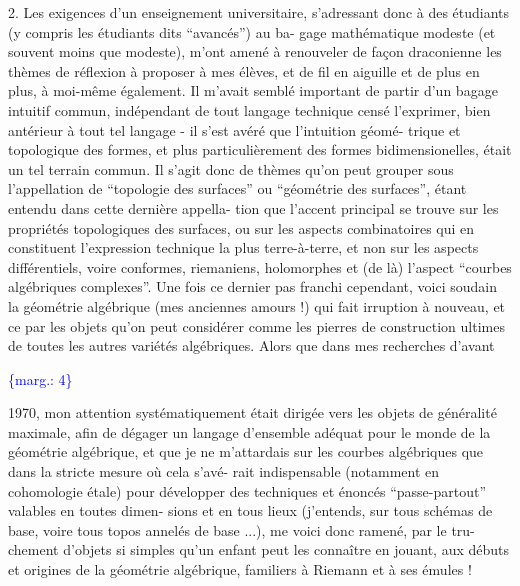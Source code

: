 \documentclass[11pt]{article}
\newcommand{\scanpage}[1]{\par\bigskip\noindent{\small\sffamily[scan #1]}\par}
\newcommand{\mspage}[1]{{\small\sffamily[p.\,#1]}}
\newcommand{\margin}[1]{\textcolor{blue}{\{\textsf{marg.:} #1\}}}
\begin{document}
2. \qquad Les exigences d'un enseignement universitaire, s'adressant
donc à des étudiants (y compris les étudiants dits ``avancés'') au ba-%
gage mathématique modeste (et souvent moins que modeste), m'ont amené
à renouveler de façon draconienne les thèmes de réflexion à proposer
à mes élèves, et de fil en aiguille et de plus en plus, à moi-même
également. Il m'avait semblé important de partir d'un bagage intuitif
commun, indépendant de tout langage technique censé l'exprimer, bien
antérieur à tout tel langage - il s'est avéré que l'intuition géomé-%
trique et topologique des formes, et plus particulièrement des formes
bidimensionelles, était un tel terrain commun. Il s'agit donc de thèmes
qu'on peut grouper sous l'appellation de ``topologie des surfaces'' ou
``géométrie des surfaces'', étant entendu dans cette dernière appella-%
tion que l'accent principal se trouve sur les propriétés topologiques
des surfaces, ou sur les aspects combinatoires qui en constituent
l'expression technique la plus terre-à-terre, et non sur les aspects
différentiels, voire conformes, riemaniens, holomorphes et (de là)
l'aspect ``courbes algébriques complexes''. Une fois ce dernier pas
franchi cependant, voici soudain la géométrie algébrique (mes anciennes
amours !) qui fait irruption à nouveau, et ce par les objets qu'on
peut considérer comme les pierres de construction ultimes de toutes
les autres variétés algébriques. Alors que dans mes recherches d'avant

\margin{4}

\clearpage
\scanpage{119/5}
\mspage{3}

1970, mon attention systématiquement était dirigée vers les objets
de généralité maximale, afin de dégager un langage d'ensemble adéquat
pour le monde de la géométrie algébrique, et que je ne m'attardais
sur les courbes algébriques que dans la stricte mesure où cela s'avé-%
rait indispensable (notamment en cohomologie étale) pour développer
des techniques et énoncés ``passe-partout'' valables en toutes dimen-%
sions et en tous lieux (j'entends, sur tous schémas de base, voire
tous topos annelés de base ...), me voici donc ramené, par le tru-%
chement d'objets si simples qu'un enfant peut les connaître en jouant,
aux débuts et origines de la géométrie algébrique, familiers à Riemann
et à ses émules !
\end{document}
